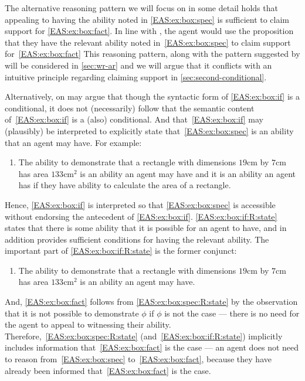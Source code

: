 \begin{note}[Alternatives]
  The alternative reasoning pattern we will focus on in some detail holds that appealing to having the ability noted in \ref{EAS:ex:box:spec} is sufficient to claim support for \ref{EAS:ex:box:fact}.
  In line with \ESU{}, the agent would use the proposition that they have the relevant ability noted in~\ref{EAS:ex:box:spec} to claim support for~\ref{EAS:ex:box:fact}
  This reasoning pattern, along with the pattern suggested by \EAS{} will be considered in \autoref{sec:wr-ar} and we will argue that it conflicts with an intuitive principle regarding claiming support in \ref{sec:second-conditional}.

  Alternatively, on may argue that though the syntactic form of \ref{EAS:ex:box:if} is a conditional, it does not (necessarily) follow that the semantic content of~\ref{EAS:ex:box:if} is a (also) conditional.
  And that~\ref{EAS:ex:box:if} may (plausibly) be interpreted to explicitly state that~\ref{EAS:ex:box:spec} is an ability that an agent may have.
  For example:
  \begin{enumerate}[label=\emph{A}\arabic*., ref=(\emph{A}\arabic*), resume*=EAS_counter]
  \item\label{EAS:ex:box:if:R:state} The ability to demonstrate that a rectangle with dimensions \(19\text{cm}\) by \(7\text{cm}\) has area \(133\text{cm}^{2}\) is an ability an agent may have and it is an ability an agent has if they have ability to calculate the area of a rectangle.
  \end{enumerate}
  Hence, \ref{EAS:ex:box:if} is interpreted so that \ref{EAS:ex:box:spec} is accessible without endorsing the antecedent of \ref{EAS:ex:box:if}.
  \ref{EAS:ex:box:if:R:state} states that there is some ability that it is possible for an agent to have, and in addition provides sufficient conditions for having the relevant ability.
  The important part of \ref{EAS:ex:box:if:R:state} is the former conjunct:
  \begin{enumerate}[label=\emph{A}\arabic*., ref=(\emph{A}\arabic*), resume*=EAS_counter]
  \item\label{EAS:ex:box:spec:R:state} The ability to demonstrate that a rectangle with dimensions \(19\text{cm}\) by \(7\text{cm}\) has area \(133\text{cm}^{2}\) is an ability an agent may have.
  \end{enumerate}
  And, \ref{EAS:ex:box:fact} follows from \ref{EAS:ex:box:spec:R:state} by the observation that it is not possible to demonstrate \(\phi\) if \(\phi\) is not the case --- there is no need for the agent to appeal to witnessing their ability.
  Therefore,~\ref{EAS:ex:box:spec:R:state} (and~\ref{EAS:ex:box:if:R:state}) implicitly includes information that~\ref{EAS:ex:box:fact} is the case --- an agent does not need to reason from~\ref{EAS:ex:box:spec} to~\ref{EAS:ex:box:fact}, because they have already been informed that~\ref{EAS:ex:box:fact} is the case.


\end{note}
